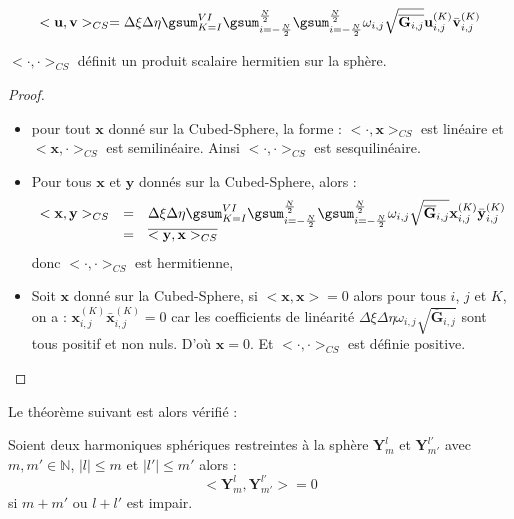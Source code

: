 \begin{equation}
<\mathbf{u}, \mathbf{v}>_{CS} = \Delta \xi \Delta \eta \gsum_{K=I}^{VI} \gsum_{i=-\frac{N}{2}}^{\frac{N}{2}} \gsum_{i=-\frac{N}{2}}^{\frac{N}{2}} \omega_{i,j} \sqrt{\overline{\mathbf{G}_{i,j}}} \mathbf{u}_{i,j}^{(K)} \bar{\mathbf{v}}_{i,j}^{(K)}
\end{equation}

\begin{proposition}
$< \cdot, \cdot >_{CS}$ définit un produit scalaire hermitien sur la sphère.
\end{proposition}

\begin{proof}
\begin{itemize}
\item pour tout $\mathbf{x}$ donné sur la Cubed-Sphere, la forme : $<\cdot, \mathbf{x}>_{CS}$ est linéaire et $<\mathbf{x}, \cdot>_{CS}$ est semilinéaire. Ainsi $<\cdot, \cdot>_{CS}$ est sesquilinéaire.

\item Pour tous $\mathbf{x}$ et $\mathbf{y}$ donnés sur la Cubed-Sphere, alors :
\begin{equation*}
\begin{array}{rcl}
< \mathbf{x} , \mathbf{y} >_{CS} & = & \Delta \xi \Delta \eta \gsum_{K=I}^{VI} \gsum_{i=-\frac{N}{2}}^{\frac{N}{2}} \gsum_{i=-\frac{N}{2}}^{\frac{N}{2}} \omega_{i,j} \sqrt{\overline{\mathbf{G}}_{i,j}} \mathbf{x}_{i,j}^{(K)} \bar{\mathbf{y}}_{i,j}^{(K)} \\

& $=$ & \overline{<\mathbf{y}, \mathbf{x}>_{CS}}
\end{array}
\end{equation*}
donc $<\cdot,\cdot>_{CS}$ est hermitienne,
\item Soit $\mathbf{x}$ donné sur la Cubed-Sphere, si $<\mathbf{x},\mathbf{x}>=0$ alors pour tous $i$, $j$ et $K$, on a : $\mathbf{x}_{i,j}^{(K)}\bar{\mathbf{x}}_{i,j}^{(K)} = 0$ car les coefficients de linéarité  $\Delta \xi \Delta \eta \omega_{i,j} \sqrt{\overline{\mathbf{G}}_{i,j}}$ sont tous positif et non nuls. D'où $\mathbf{x} = 0$. Et $<\cdot, \cdot >_{CS}$ est définie positive.
\end{itemize}
\end{proof}


Le théorème suivant est alors vérifié :

\begin{theoreme}
Soient deux harmoniques sphériques restreintes à la sphère $\mathbf{Y}_m^l$ et $\mathbf{Y}_{m'}^{l'}$ avec $m, m' \in \mathbb{N}$, $|l| \leq m$ et $|l'| \leq m'$ alors :
\begin{equation}
<\mathbf{Y}_{m}^{l},\mathbf{Y}_{m'}^{l'}> = 0 
\end{equation}
si $m+m'$ ou $l+l'$ est impair.
\end{theoreme}

